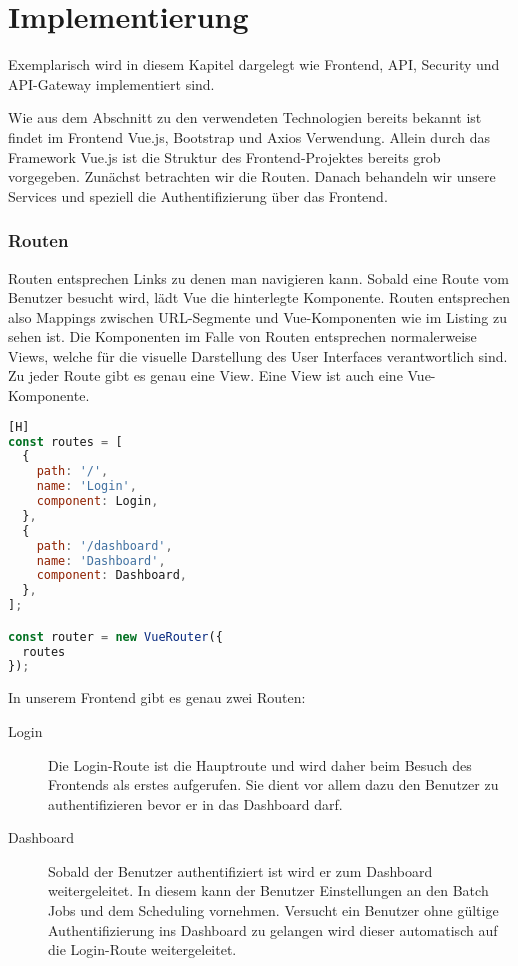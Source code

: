 \chapter{Implementierung}
Exemplarisch wird in diesem Kapitel dargelegt wie Frontend, API, Security und API-Gateway implementiert sind.

Wie aus dem Abschnitt zu den verwendeten Technologien bereits bekannt ist findet im Frontend Vue.js, Bootstrap und Axios Verwendung. Allein durch das Framework Vue.js ist die Struktur des Frontend-Projektes bereits grob vorgegeben. Zunächst betrachten wir die Routen. Danach behandeln wir unsere Services und speziell die Authentifizierung über das Frontend.

\subsection{Routen}
Routen entsprechen Links zu denen man navigieren kann. Sobald eine Route vom Benutzer besucht wird, lädt Vue die hinterlegte Komponente. Routen entsprechen also Mappings zwischen URL-Segmente und Vue-Komponenten wie im Listing zu sehen ist. Die Komponenten im Falle von Routen entsprechen normalerweise Views, welche für die visuelle Darstellung des User Interfaces verantwortlich sind. Zu jeder Route gibt es genau eine View. Eine View ist auch eine Vue-Komponente.

\begin{lstlisting}[language=JavaScript,caption=src/router/index.js][H]
const routes = [
  {
    path: '/',
    name: 'Login',
    component: Login,
  },
  {
    path: '/dashboard',
    name: 'Dashboard',
    component: Dashboard,
  },
];

const router = new VueRouter({
  routes
});
\end{lstlisting}

In unserem Frontend gibt es genau zwei Routen:
\begin{description}
    \item[Login] Die Login-Route ist die Hauptroute und wird daher beim Besuch des Frontends als erstes aufgerufen. Sie dient vor allem dazu den Benutzer zu authentifizieren bevor er in das Dashboard darf.
    
    \item[Dashboard] Sobald der Benutzer authentifiziert ist wird er zum Dashboard weitergeleitet. In diesem kann der Benutzer Einstellungen an den Batch Jobs und dem Scheduling vornehmen. Versucht ein Benutzer ohne gültige Authentifizierung ins Dashboard zu gelangen wird dieser automatisch auf die Login-Route weitergeleitet.
\end{description}

